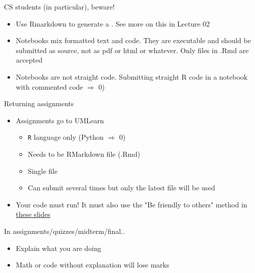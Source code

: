\documentclass[aspectratio=169]{beamer}\usepackage[]{graphicx}\usepackage[]{xcolor}
\begin{document}
\begin{frame}{CS students (in particular), beware!}
\begin{itemize}
\item Use Rmarkdown to generate a . See more on this in Lecture 02
\vfill
\item Notebooks mix formatted text and code. They are executable and should be submitted as source, not as pdf or html or whatever. Only files in .Rmd are accepted
\vfill
\item Notebooks are not straight code. Submitting straight R code in a notebook with commented code $\Rightarrow$ 0)
\end{itemize}
\end{frame}

\begin{frame}{Returning assignments}
\begin{itemize}
\item Assignments go to UMLearn
    \begin{itemize}
    \item \texttt{R} language only (Python $\Rightarrow$ 0)
    \item Needs to be RMarkdown file (.Rmd)
    \item Single file
    \item Can submit several times but only the latest file will be used
    \end{itemize}
    \vfill
    \item Your code must run! It must also use the "Be friendly to others" method in \href{https://julien-arino.github.io/R-for-modellers/SLIDES/vignette-03-installing-using-packages.html\#/be-friendly-to-others}{these slides}
\end{itemize}
\end{frame}

\begin{frame}{In assignments/quizzes/midterm/final..}
\begin{itemize}
\item Explain what you are doing
\vfill
\item Math or code without explanation will lose marks
\end{itemize}
\end{frame}
\end{document}
